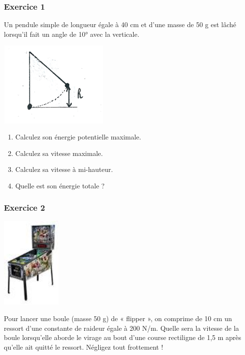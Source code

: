 \begin{multicols}{2}
\subsubsection{Exercice 1}
Un pendule simple de longueur égale à 40 cm et d’une masse de 50 g est lâché lorsqu’il fait un angle de 10° avec la
verticale. 
\begin{center}
\begin{minipage}{5.992cm}
 \includegraphics[width=5.457cm,height=4.239cm]{COURS2EnergieOHEXERCRESOL-img/COURS2EnergieOHEXERCRESOL-img002.png} 
\end{minipage}
\end{center}
\begin{enumerate}
\item Calculez son énergie potentielle maximale.
\item Calculez sa vitesse maximale.
\item Calculez sa vitesse à mi-hauteur. 
\item Quelle est son énergie totale ? 
\end{enumerate}

\subsubsection{Exercice 2}
\begin{center}
\begin{minipage}{3.81cm}
 \includegraphics[width=3cm]{COURS2EnergieOHEXERCRESOL-img/COURS2EnergieOHEXERCRESOL-img003.png} 
\end{minipage}
\end{center}
Pour lancer une boule (masse 50 g) de « flipper », on comprime de 10 cm un ressort d’une constante de  raideur égale à
200 N/m. Quelle sera la vitesse de la boule lorsqu’elle aborde le virage au bout d’une course rectiligne de 1,5 m après
qu’elle ait quitté le ressort. Négligez tout frottement !


\end{multicols}
